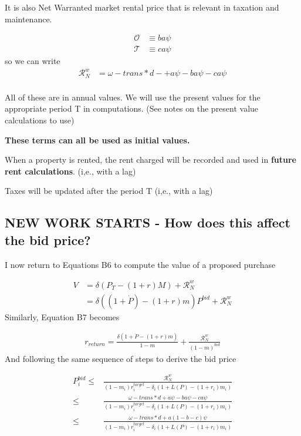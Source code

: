 It is also Net Warranted market  rental price that is relevant in taxation and maintenance. 

\begin{align}
\mathcal{O} &\equiv  ba\psi\\%
 \mathcal{T} &\equiv ca\psi %
\end{align}
so we can write
 \begin{align}
\mathcal{R}_N^w &= \omega - trans*d- + a\psi -   ba\psi - ca\psi \\
\end{align}

All of these are in annual values. We will use the present values  for the appropriate period  T in computations. (See notes on the present value calculations to use)

\textbf{These terms can all be used as initial values.}

When a property is rented, the rent charged will be recorded and used in \textbf{future rent calculations}.   (i,e., with a lag)

Taxes will be updated after the period T (i,e., with a lag)

\subsection{NEW WORK STARTS - How does this affect the bid price?}

I now return to Equations B6 to compute the value of a proposed purchase


\begin{align*}
V &= \delta \left(P_T - (1+r)M\right) +      \mathcal{R}^w_N  \tag{B6} \\
  &= \delta \left((1+\dot P)    - (1+r)m    \right) P^{bid} + \mathcal{R}^w_N%
\end{align*}
Similarly, Equation B7 becomes

\begin{align*}
r_{return} = \frac{\delta \left(1 + \dot P - (1+r)m\right)}{1-m} + \frac{\mathcal{R}^w_N}{(1-m)^{bid}}\tag{B7}
\end{align*}
And following the same sequence of steps to derive the bid price 

\begin{align*}
P_i^{bid} \le &   \frac{\mathcal{R}^w_N}{(1-m_i)r_i^{target} - \delta_i \left(1 + L(P) - (1+r_i)m_i \right)} \tag{B10}\\
		 \le &   \frac{ \omega - trans*d + a\psi -   ba\psi - ca\psi}{(1-m_i)r_i^{target} - \delta_i \left(1 + L(P) - (1+r_i)m_i \right)}	\\	
   		 \le &   \frac{ \omega - trans*d + a(1-b-c)\psi}{(1-m_i)r_i^{target} - \delta_i \left(1 + L(P) - (1+r_i)m_i \right)}	
\end{align*}

